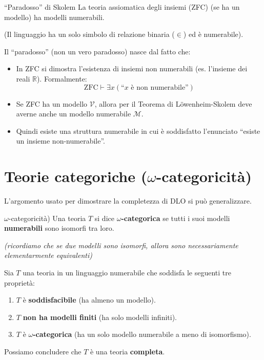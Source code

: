 \documentclass[a4paper,11pt]{report}
\begin{document}
\begin{corframe}{``Paradosso'' di Skolem}
    La teoria assiomatica degli insiemi (ZFC) (se ha un modello) ha modelli numerabili.

    (Il linguaggio ha un solo simbolo di relazione binaria (\(\in\)) ed è numerabile).

    Il ``paradosso'' (non un vero paradosso) nasce dal fatto che:
\begin{itemize}
    \item In ZFC si dimostra l'esistenza di insiemi non numerabili (es. l'insieme dei reali \(\mathbb{R}\)). Formalmente:
    \[
    \text{ZFC} \vdash \exists x (\text{``}x \text{ è non numerabile''})
    \]
    \item Se ZFC ha un modello \(\mathcal{V}\), allora per il Teorema di Löwenheim-Skolem deve averne anche un modello numerabile \(\mathcal{M}\).
    \item Quindi esiste una struttura numerabile in cui è soddisfatto l'enunciato ``esiste un insieme non-numerabile''.
\end{itemize}

\end{corframe}

\section{Teorie categoriche (\(\omega\)-categoricità)}

L'argomento usato per dimostrare la completezza di DLO si può generalizzare.

\begin{defframe}{\(\omega\)-categoricità)}{}
Una teoria \(T\) si dice \textbf{\(\omega\)-categorica} se tutti i suoi modelli \textbf{numerabili} sono isomorfi tra loro.

\textit{(ricordiamo che se due modelli sono isomorfi, allora sono necessariamente elementarmente equivalenti)}
\end{defframe}

Sia \(T\) una teoria in un linguaggio numerabile che soddisfa le seguenti tre proprietà:
\begin{enumerate}
    \item \(T\) è \textbf{soddisfacibile} (ha almeno un modello).
    \item \(T\) \textbf{non ha modelli finiti} (ha solo modelli infiniti).
    \item \(T\) è \textbf{\(\omega\)-categorica} (ha un solo modello numerabile a meno di isomorfismo).
\end{enumerate}
Possiamo concludere che \(T\) è una teoria \textbf{completa}.
\end{document}
